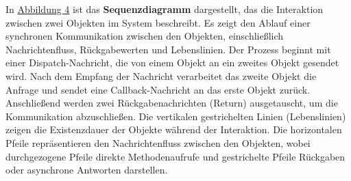 In \hyperref[fig:fig-4]{Abbildung 4} ist das \textbf{Sequenzdiagramm} dargestellt, das die Interaktion zwischen zwei Objekten im System beschreibt. Es zeigt den Ablauf einer 
synchronen Kommunikation zwischen den Objekten, einschließlich Nachrichtenfluss, Rückgabewerten und Lebenslinien. Der Prozess beginnt mit einer Dispatch-Nachricht, 
die von einem Objekt an ein zweites Objekt gesendet wird. Nach dem Empfang der Nachricht verarbeitet das zweite Objekt die Anfrage und sendet eine Callback-Nachricht 
an das erste Objekt zurück. Anschließend werden zwei Rückgabenachrichten (Return) ausgetauscht, um die Kommunikation abzuschließen. Die vertikalen gestrichelten 
Linien (Lebenslinien) zeigen die Existenzdauer der Objekte während der Interaktion. Die horizontalen Pfeile repräsentieren den Nachrichtenfluss zwischen den Objekten, 
wobei durchgezogene Pfeile direkte Methodenaufrufe und gestrichelte Pfeile Rückgaben oder asynchrone Antworten darstellen.